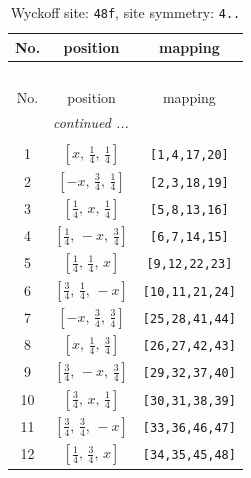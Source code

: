 \documentclass[fleqn,8pt]{jsarticle}
\begin{document}
\begin{longtable}{ccc}
\caption{Wyckoff site: {\tt 48f}, site symmetry: {\tt 4..}}
 \\
 \hline \hline
No. & position & mapping \\ \hline \endfirsthead

\multicolumn{2}{l}{\tablename\ \thetable{}} \\
 \hline \hline
No. & position & mapping \\ \hline \endhead

 \hline \hline
\multicolumn{2}{r}{\footnotesize\it continued ...} \\ \endfoot

 \hline \hline
\multicolumn{2}{r}{} \\ \endlastfoot

1 & $\left[ x,\, \frac{1}{4},\, \frac{1}{4} \right]$ & {\tt [1,4,17,20]} \\ \hline
2 & $\left[ - x,\, \frac{3}{4},\, \frac{1}{4} \right]$ & {\tt [2,3,18,19]} \\ \hline
3 & $\left[ \frac{1}{4},\, x,\, \frac{1}{4} \right]$ & {\tt [5,8,13,16]} \\ \hline
4 & $\left[ \frac{1}{4},\, - x,\, \frac{3}{4} \right]$ & {\tt [6,7,14,15]} \\ \hline
5 & $\left[ \frac{1}{4},\, \frac{1}{4},\, x \right]$ & {\tt [9,12,22,23]} \\ \hline
6 & $\left[ \frac{3}{4},\, \frac{1}{4},\, - x \right]$ & {\tt [10,11,21,24]} \\ \hline
7 & $\left[ - x,\, \frac{3}{4},\, \frac{3}{4} \right]$ & {\tt [25,28,41,44]} \\ \hline
8 & $\left[ x,\, \frac{1}{4},\, \frac{3}{4} \right]$ & {\tt [26,27,42,43]} \\ \hline
9 & $\left[ \frac{3}{4},\, - x,\, \frac{3}{4} \right]$ & {\tt [29,32,37,40]} \\ \hline
10 & $\left[ \frac{3}{4},\, x,\, \frac{1}{4} \right]$ & {\tt [30,31,38,39]} \\ \hline
11 & $\left[ \frac{3}{4},\, \frac{3}{4},\, - x \right]$ & {\tt [33,36,46,47]} \\ \hline
12 & $\left[ \frac{1}{4},\, \frac{3}{4},\, x \right]$ & {\tt [34,35,45,48]} \\
\end{longtable}
\renewcommand{\arraystretch}{1.2}
\end{document}
